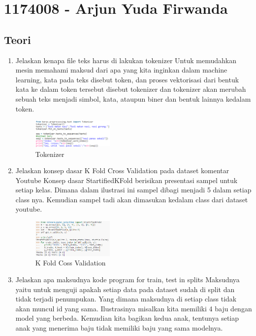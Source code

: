 \section{1174008 - Arjun Yuda Firwanda}

\subsection{Teori}
\begin{enumerate}

        \item Jelaskan kenapa ﬁle teks harus di lakukan tokenizer
Untuk memudahkan mesin memahami maksud dari apa yang kita inginkan dalam machine learning, kata pada teks disebut token, dan proses vektorisasi dari bentuk kata ke dalam token tersebut disebut tokenizer dan tokenizer akan merubah sebuah teks menjadi simbol, kata, ataupun biner dan bentuk lainnya kedalam token. 

	\begin{figure}[H]
            	\includegraphics[width=4cm]{figures/1174008/7/teori1.PNG}
           	 \centering
           	 \caption{Tokenizer}
        	\end{figure}

        \item Jelaskan konsep dasar K Fold Cross Validation pada dataset komentar Youtube
Konsep dasar StartifiedKFold berisikan presentasi sampel untuk setiap kelas. Dimana dalam ilustrasi ini sampel dibagi menjadi 5 dalam setiap class nya. Kemudian sampel tadi akan dimasukan kedalam class dari dataset youtube.

	\begin{figure}[H]
		\includegraphics[width=4cm]{figures/1174008/7/teori2.PNG}
            	\centering
           	 \caption{K Fold Coss Validation}
       	 \end{figure}

        \item Jelaskan apa maksudnya kode program for train, test in splits
Maksudnya yaitu untuk menguji apakah setiap data pada dataset sudah di split dan tidak terjadi penumpukan. Yang dimana maksudnya di setiap class tidak akan muncul id yang sama. Ilustrasinya misalkan kita memiliki 4 baju dengan model yang berbeda. Kemudian kita bagikan kedua anak, tentunya setiap anak yang menerima baju tidak memiliki baju yang sama modelnya.


\end{enumerate}
